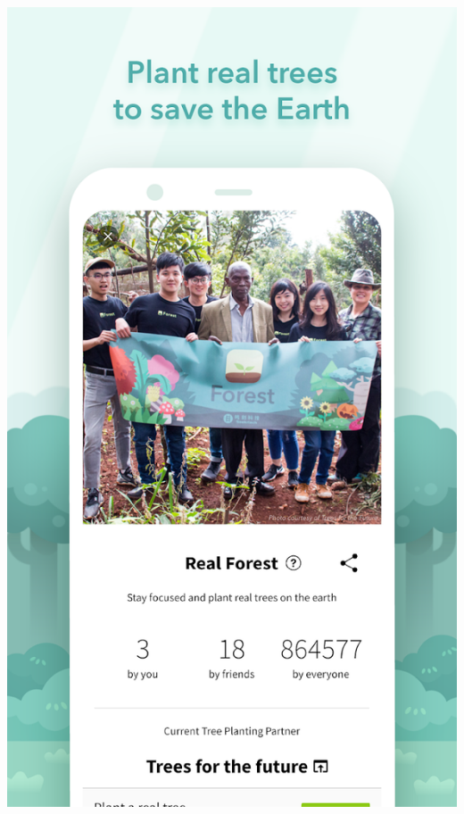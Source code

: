 \documentclass[11pt]{article}
\begin{document}
\begin{center}
\includegraphics[width=.9\linewidth]{./docs/3.png}
\end{center}
\end{document}
